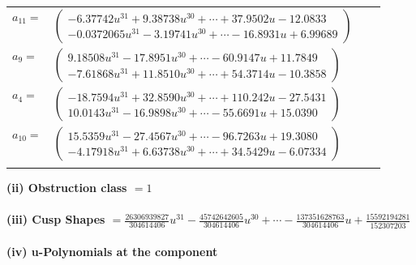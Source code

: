 \documentclass[1p]{elsarticle_modified}
\theoremstyle{definition}
\begin{document}
\begin{tabular}{m{7pt} m{180pt} m{7pt} m{180pt} }
\flushright $a_{11}=$&$\begin{pmatrix}-6.37742 u^{31}+9.38738 u^{30}+\cdots+37.9502 u-12.0833\\-0.0372065 u^{31}-3.19741 u^{30}+\cdots-16.8931 u+6.99689\end{pmatrix}$ \\
\flushright $a_{9}=$&$\begin{pmatrix}9.18508 u^{31}-17.8951 u^{30}+\cdots-60.9147 u+11.7849\\-7.61868 u^{31}+11.8510 u^{30}+\cdots+54.3714 u-10.3858\end{pmatrix}$ \\
\flushright $a_{4}=$&$\begin{pmatrix}-18.7594 u^{31}+32.8590 u^{30}+\cdots+110.242 u-27.5431\\10.0143 u^{31}-16.9898 u^{30}+\cdots-55.6691 u+15.0390\end{pmatrix}$ \\
\flushright $a_{10}=$&$\begin{pmatrix}15.5359 u^{31}-27.4567 u^{30}+\cdots-96.7263 u+19.3080\\-4.17918 u^{31}+6.63738 u^{30}+\cdots+34.5429 u-6.07334\end{pmatrix}$\\&\end{tabular}
\flushleft \textbf{(ii) Obstruction class $= 1$}\\~\\
\flushleft \textbf{(iii) Cusp Shapes $= \frac{26306939827}{304614406} u^{31}-\frac{45742642605}{304614406} u^{30}+\cdots-\frac{137351628763}{304614406} u+\frac{15592194281}{152307203}$}\\~\\
\newpage\renewcommand{\arraystretch}{1}
\flushleft \textbf{(iv) u-Polynomials at the component}\newline \\
\end{document}
